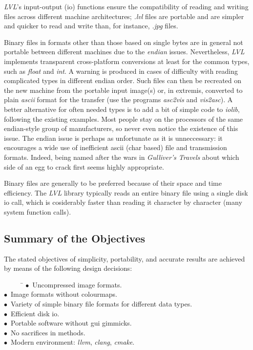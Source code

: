 \documentclass[11pt,twoside,english,a4paper]{article}
\begin{document}
\emph{LVL}'s input-output (io) functions ensure the compatibility of reading and writing 
files across different machine architectures; \emph{.lvl} files are portable and are simpler and
quicker to read and write than, for instance, \emph{.jpg} files.

Binary files in formats other than those based on single bytes
are in general not portable between different machines due to the \emph{endian} issues. 
Nevertheless, \emph{LVL} implements transparent cross-platform conversions at least for the common types, such as \emph{float} and \emph{int}. A warning is produced in cases of difficulty with reading complicated types in different endian order. Such files can then be recreated on the new machine from the portable input image(s) or, in extremis, converted to plain \emph{ascii} format for the transfer (use the programs \emph{asc2vis} and \emph{vis2asc}). A better alternative for often needed types is to add a bit of simple code to \emph{iolib}, following the existing examples. Most people stay on the processors of the same endian-style group of manufacturers, so never even notice the existence of this issue. The endian issue is perhaps as unfortunate as it is unneccessary: it encourages a wide use of inefficient ascii (char based) file and transmission formats. Indeed, being named after the wars in \emph{Gulliver's Travels} about which side of an egg to crack first seems highly appropriate.

Binary files are generally to be preferred because of their space and time efficiency. 
The \emph{LVL} library typically reads an entire binary file using a single disk io call, which is cosiderably faster than
reading it character by character (many system function calls).

\subsection{Summary of the Objectives}
The stated objectives of simplicity, portability, and accurate results
are achieved by means of the following design decisions:
\begin{tabbing} ~~~~\={ ~}\={\kill}
\>$\bullet$~Uncompressed image formats.\\
\>$\bullet$~Image formats without colourmaps.\\
\>$\bullet$~Variety of simple binary file formats for different data types.\\
\>$\bullet$~Efficient disk io.\\
\>$\bullet$~Portable software without gui gimmicks.\\
\>$\bullet$~No sacrifices in methods.\\
\>$\bullet$~Modern environment: \emph{llvm}, \emph{clang}, \emph{cmake}.
\end{tabbing}
\end{document}
